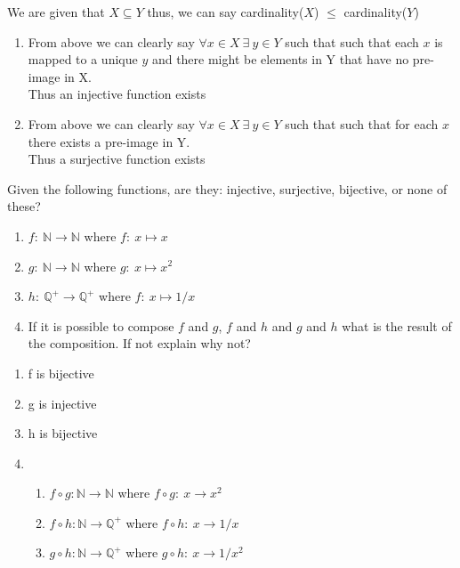 \documentclass[12pt]{article}
\newcommand{\N}{\mathbb{N}}
\newcommand{\Q}{\mathbb{Q}}
\newenvironment{solution}[2][Solution]{ \begin{trivlist}
\item[\hskip \labelsep {\bfseries #1}]}{\end{trivlist}}
\newenvironment{problem}[2][Problem]{\begin{trivlist}
\item[\hskip \labelsep {\bfseries #1}\hskip \labelsep {\bfseries #2.}]}{\end{trivlist}}
\begin{document}
\begin{solution}{4}
\item[]
We are given that $X \subseteq Y$ thus, we can say cardinality($X$) $\leq$ cardinality($Y$)
\begin{enumerate}[label=\alph*)]
    \item From above we can clearly say $\forall x \in X\ \exists\ y \in Y$ such that such that each $x$ is mapped to a unique $y$ and there might be elements in Y that have no pre-image in X.\\
    Thus an injective function exists
    \item From above we can clearly say $\forall x \in X\ \exists\ y \in Y$ such that such that for each $x$ there exists a pre-image in Y.\\
    Thus a surjective function exists
\end{enumerate}
\end{solution}

\vskip 0.5in

\begin{problem}{5}Given the following functions, are they: injective, surjective, bijective, or none of these?
\item[]
\begin{enumerate}[label=\alph*)]
    \item $ f \colon \ \N \longrightarrow \N$ where
    $ f \colon \ x \mapsto x$
    \item $ g \colon \ \N \longrightarrow \N$ where
    $ g \colon \ x \mapsto x^2$
    \item $h \colon \ \Q^+ \longrightarrow \Q^+$ where
    $ f \colon \ x \mapsto 1/x$
    \item If it is possible to compose $f$ and $g$, $f$ and $h$ and $g$ and $h$ what is the result of the composition. If not explain why not?
\end{enumerate}
\end{problem}
\begin{solution}{5}
\item[]
\begin{enumerate}[label=\alph*)]
    \item f is bijective
    \item g is injective
    \item h is bijective
    \item 
    \begin{enumerate}[label=(\roman*)]
        \item $f \circ g \colon \N \longrightarrow \N$ where $ f \circ g \colon \ x \longrightarrow x^2$
        \item $f \circ h \colon \N \longrightarrow \Q^+$ where $ f \circ h \colon \ x \longrightarrow 1/x$
        \item $g \circ h \colon \N \longrightarrow \Q^+$ where $ g \circ h \colon \ x \longrightarrow 1/x^2$
    \end{enumerate}
\end{enumerate}
\end{solution}
\end{document}
